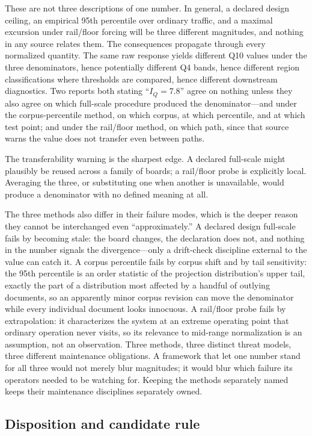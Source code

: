 These are not three descriptions of one number. In general, a declared design
ceiling, an empirical 95th percentile over ordinary traffic, and a maximal
excursion under rail/floor forcing will be three different magnitudes, and
nothing in any source relates them. The consequences propagate through every
normalized quantity. The same raw response yields different Q10 values under
the three denominators, hence potentially different Q4 bands, hence different
region classifications where thresholds are compared, hence different
downstream diagnostics. Two reports both stating ``$I_Q = 7.8$'' agree on
nothing unless they also agree on which full-scale procedure produced the
denominator---and under the corpus-percentile method, on which corpus, at
which percentile, and at which test point; and under the rail/floor method,
on which path, since that source warns the value does not transfer even
between paths.

The transferability warning is the sharpest edge. A declared full-scale might
plausibly be reused across a family of boards; a rail/floor probe is
explicitly local. Averaging the three, or substituting one when another is
unavailable, would produce a denominator with no defined meaning at all.

The three methods also differ in their failure modes, which is the deeper
reason they cannot be interchanged even ``approximately.'' A declared design
full-scale fails by becoming stale: the board changes, the declaration does
not, and nothing in the number signals the divergence---only a drift-check
discipline external to the value can catch it. A corpus percentile fails by
corpus shift and by tail sensitivity: the 95th percentile is an order
statistic of the projection distribution's upper tail, exactly the part of a
distribution most affected by a handful of outlying documents, so an
apparently minor corpus revision can move the denominator while every
individual document looks innocuous. A rail/floor probe fails by
extrapolation: it characterizes the system at an extreme operating point
that ordinary operation never visits, so its relevance to mid-range
normalization is an assumption, not an observation. Three methods, three
distinct threat models, three different maintenance obligations. A framework
that let one number stand for all three would not merely blur magnitudes; it
would blur which failure its operators needed to be watching for. Keeping
the methods separately named keeps their maintenance disciplines separately
owned.

\subsection{Disposition and candidate rule}

